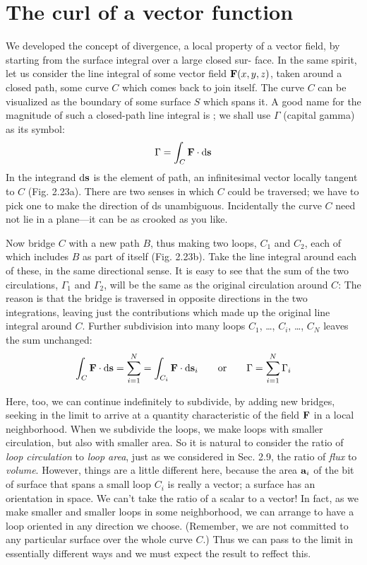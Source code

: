 \section{The curl of a vector function}

We developed the concept of divergence, a local property of a vector
field, by starting from the surface integral over a large closed sur-
face. In the same spirit, let us consider the line integral of some vector
field $\mathbf{F}(x,y,z)$, taken around a closed path, some curve $C$ which
comes back to join itself. The curve $C$ can be visualized as the
boundary of some surface $S$ which spans it. A good name for the
magnitude of such a closed-path line integral is ; we shall
use $\Gamma$ (capital gamma) as its symbol:
\begin{equation}
  \Gamma = \int_C \mathbf{F}\cdot\operatorname{d\!}\mathbf{s}
\end{equation}
In the integrand $\operatorname{d\!}\mathbf{s}$ is the element of path, an infinitesimal vector
locally tangent to $C$ (Fig. 2.23a). There are two senses in which $C$
could be traversed; we have to pick one to make the direction of ds
unambiguous. Incidentally the curve $C$ need not lie in a plane---it
can be as crooked as you like.

Now bridge $C$ with a new path $B$, thus making two loops, $C_1$ and
$C_2$, each of which includes $B$ as part of itself (Fig. 2.23b). Take the
line integral around each of these, in the same directional sense. It
is easy to see that the sum of the two circulations, $\Gamma_1$ and $\Gamma_2$, will be
the same as the original circulation around $C$: The reason is that the
bridge is traversed in opposite directions in the two integrations,
leaving just the contributions which made up the original line integral
around $C$. Further subdivision into many loops $C_1$, \ldots , $C_i$, \ldots , $C_N$
leaves the sum unchanged:
\begin{equation}
  \int_C \mathbf{F}\cdot\operatorname{d\!}\mathbf{s} = \sum_{i=1}^N 
          = \int_{C_i} \mathbf{F}\cdot\operatorname{d\!}\mathbf{s}_i
   \qquad \text{or} \qquad
  \Gamma = \sum_{i=1}^N \Gamma_i
\end{equation}

Here, too, we can continue indefinitely to subdivide, by adding
new bridges, seeking in the limit to arrive at a quantity characteristic
of the field $\mathbf{F}$ in a local neighborhood. When we subdivide the loops,
we make loops with smaller circulation, but also with smaller area.
So it is natural to consider the ratio of \emph{loop circulation} to \emph{loop area},
just as we considered in Sec. 2.9, the ratio of \emph{flux} to \emph{volume}. However,
things are a little different here, because the area $\mathbf{a}_i$ of the bit
of surface that spans a small loop $C_i$ is really a vector; a surface has
an orientation in space. We can't take the ratio of a scalar to a
vector! In fact, as we make smaller and smaller loops in some
neighborhood, we can arrange to have a loop oriented in any direction
we choose. (Remember, we are not committed to any particular
surface over the whole curve $C$.) Thus we can pass to the limit in
essentially different ways and we must expect the result to reffect this.

